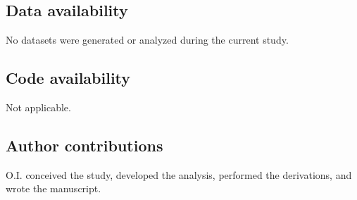 \documentclass[aps,pre,reprint,amsmath,amssymb,floatfix,nofootinbib]{revtex4-2}
\begin{document}
\subsection*{Data availability}
    No datasets were generated or analyzed during the current study.

\subsection*{Code availability}
    Not applicable.

\subsection*{Author contributions}
    O.I. conceived the study, developed the analysis, performed the derivations, and wrote the manuscript.
\end{document}

